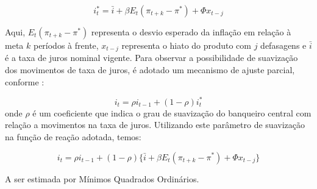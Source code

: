 \documentclass[
	article,			%
	11pt,				%
	oneside,			%
	a4paper,			%
	english,			%
	brazil,				%
	]{abntex2}
\begin{document}
	\begin{equation}
		i_t^* = \bar{i} + \beta E_t(\pi_{t+k} - \pi^*) + \Phi x_{t-j}
	\end{equation}
	
	Aqui, $E_t(\pi_{t+k} - \pi^*)$ representa o desvio esperado da inflação em relação à meta $k$ períodos à frente, $x_{t-j}$ representa o hiato do produto com $j$ defasagens e $\bar{i}$ é a taxa de juros nominal vigente. Para observar a possibilidade de suavização dos movimentos de taxa de juros, é adotado um mecanismo de ajuste parcial, conforme :
		
	\begin{equation}
		i_t = \rho i_{t-1} + (1-\rho) i_t^*
	\end{equation}
	onde $\rho$ é um coeficiente que indica o grau de suavização do banqueiro central com relação a movimentos na taxa de juros. Utilizando este parâmetro de suavização na função de reação adotada, temos:
	
	\begin{equation}
		i_t = \rho i_{t-1} + (1-\rho) \{ \bar{i} + \beta E_t(\pi_{t+k} - \pi^*) + \Phi x_{t-j} \}
	\end{equation}
	
	A ser estimada por Mínimos Quadrados Ordinários.
	
\end{document}
